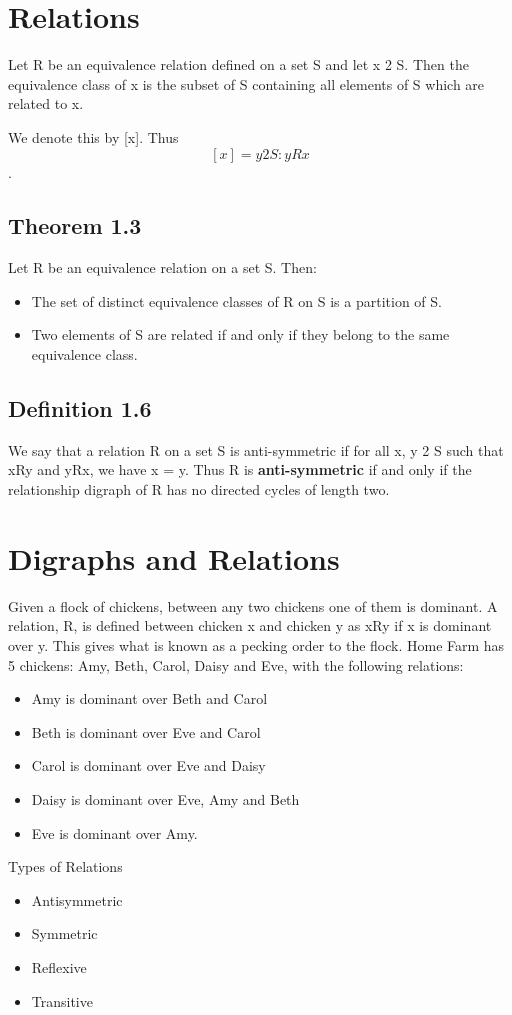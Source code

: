 \documentclass[MASTER.tex]{subfiles}
\begin{document}
\section{Relations}

Let R be an equivalence relation defined on a set S and let x 2 S. 
Then the equivalence class of x is the subset of S containing all
elements of S which are related to x. 

We denote this by [x]. Thus
\[[x] = {y 2 S : yRx}\].

\subsection*{Theorem 1.3 }
Let R be an equivalence relation on a set S. Then:
\begin{itemize}
\item The set of distinct equivalence classes of R on S is a partition of S.
\item Two elements of S are related if and only if they belong to the same equivalence
class.
\end{itemize}
\subsection*{Definition 1.6} We say that a relation R on a set S is anti-symmetric if for
all x, y 2 S such that xRy and yRx, we have x = y. 
Thus R is \textbf{anti-symmetric}
if and only if the relationship digraph of R has no directed cycles of length two.


\newpage
\section{Digraphs and Relations}
Given a flock of chickens, between any two chickens one of them is
dominant. A relation, R, is defined between chicken x and chicken y as xRy if x is
dominant over y. This gives what is known as a pecking order to the flock. Home
Farm has 5 chickens: Amy, Beth, Carol, Daisy and Eve, with the following relations:

\begin{itemize}
\item Amy is dominant over Beth and Carol
\item Beth is dominant over Eve and Carol
\item Carol is dominant over Eve and Daisy
\item Daisy is dominant over Eve, Amy and Beth
\item Eve is dominant over Amy.
\end{itemize}

\newpage


Types of Relations

\begin{itemize}
\item Antisymmetric
\item Symmetric
\item Reflexive 
\item Transitive
\end{itemize}
\end{document}
